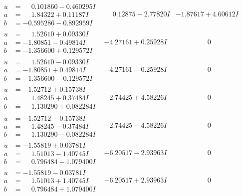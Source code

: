 \documentclass[1p]{elsarticle_modified}
\theoremstyle{definition}
\begin{document}
$$\begin{array}{c|c|c}
\begin{aligned}
u &= \phantom{-}0.101860 - 0.460295 I \\
a &= \phantom{-}1.84322 + 0.11187 I \\
b &= -0.595286 - 0.892959 I\end{aligned}
 & \phantom{-}0.12875 - 2.77820 I & -1.87617 + 4.60612 I \\ \hline\begin{aligned}
u &= \phantom{-}1.52610 + 0.09330 I \\
a &= -1.80851 - 0.49814 I \\
b &= -1.356600 + 0.129572 I\end{aligned}
 & -4.27161 + 0.25928 I & \phantom{-0.000000 } 0 \\ \hline\begin{aligned}
u &= \phantom{-}1.52610 - 0.09330 I \\
a &= -1.80851 + 0.49814 I \\
b &= -1.356600 - 0.129572 I\end{aligned}
 & -4.27161 - 0.25928 I & \phantom{-0.000000 } 0 \\ \hline\begin{aligned}
u &= -1.52712 + 0.15738 I \\
a &= \phantom{-}1.48245 + 0.37484 I \\
b &= \phantom{-}1.130290 + 0.082284 I\end{aligned}
 & -2.74425 + 4.58226 I & \phantom{-0.000000 } 0 \\ \hline\begin{aligned}
u &= -1.52712 - 0.15738 I \\
a &= \phantom{-}1.48245 - 0.37484 I \\
b &= \phantom{-}1.130290 - 0.082284 I\end{aligned}
 & -2.74425 - 4.58226 I & \phantom{-0.000000 } 0 \\ \hline\begin{aligned}
u &= -1.55819 + 0.03781 I \\
a &= \phantom{-}1.51013 - 1.40745 I \\
b &= \phantom{-}0.796484 - 1.079400 I\end{aligned}
 & -6.20517 - 2.93963 I & \phantom{-0.000000 } 0 \\ \hline\begin{aligned}
u &= -1.55819 - 0.03781 I \\
a &= \phantom{-}1.51013 + 1.40745 I \\
b &= \phantom{-}0.796484 + 1.079400 I\end{aligned}
 & -6.20517 + 2.93963 I & \phantom{-0.000000 } 0 \\ \hline\begin{aligned}

\end{aligned}
\end{array}$$
\end{document}
